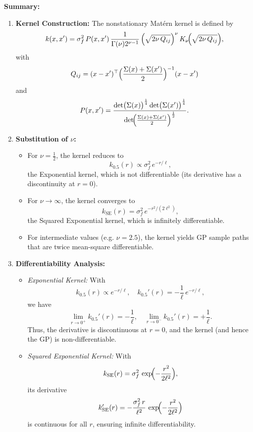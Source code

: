 \documentclass[11pt]{article}
\begin{document}
\textbf{Summary:}
\begin{enumerate}[label=(\arabic*)]
    \item \textbf{Kernel Construction:} The nonstationary Matérn kernel is defined by
    \[
    k(x,x')=\sigma_f^2\, P(x,x')\, \frac{1}{\Gamma(\nu)2^{\nu-1}}
    \left(\sqrt{2\nu\,Q_{ij}}\right)^{\nu}K_{\nu}\!\Bigl({\sqrt{2\nu\,Q_{ij}}}\Bigr),
    \]
    with
    \[
    Q_{ij}=(x-x')^\top\Bigl({\frac{\Sigma(x)+\Sigma(x')}{2}}\Bigr)^{-1}(x-x')
    \]
    and
    \[
    P(x,x')=\frac{\det\bigl(\Sigma(x)\bigr)^{\frac{1}{4}}\det\bigl(\Sigma(x')\bigr)^{\frac{1}{4}}}{\det\!\Bigl({\frac{\Sigma(x)+\Sigma(x')}{2}}\Bigr)^{\frac{1}{2}}}.
    \]
    \item \textbf{Substitution of $\nu$:} 
    \begin{itemize}
        \item For $\nu=\frac{1}{2}$, the kernel reduces to 
        \[
        k_{0.5}(r)\propto\sigma_f^2\,e^{-r/\ell},
        \]
        the Exponential kernel, which is not differentiable (its derivative has a discontinuity at $r=0$).
        \item For $\nu\to\infty$, the kernel converges to 
        \[
        k_{\text{SE}}(r)=\sigma_f^2\,e^{-r^2/(2\ell^2)},
        \]
        the Squared Exponential kernel, which is infinitely differentiable.
        \item For intermediate values (e.g. $\nu=2.5$), the kernel yields GP sample paths that are twice mean-square differentiable.
    \end{itemize}
    \item \textbf{Differentiability Analysis:}
    \begin{itemize}
        \item \emph{Exponential Kernel:} With 
        \[
        k_{0.5}(r)\propto e^{-r/\ell},\quad k_{0.5}'(r)=-\frac{1}{\ell}\,e^{-r/\ell},
        \]
        we have 
        \[
        \lim_{r\to0^+}k_{0.5}'(r)=-\frac{1}{\ell},\quad \lim_{r\to0^-}k_{0.5}'(r)=+\frac{1}{\ell}.
        \]
        Thus, the derivative is discontinuous at $r=0$, and the kernel (and hence the GP) is non-differentiable.
        \item \emph{Squared Exponential Kernel:} With
        \[
        k_{\text{SE}}(r)=\sigma_f^2\,\exp\!\Bigl({-\frac{r^2}{2\ell^2}}\Bigr),
        \]
        its derivative 
        \[
        k_{\text{SE}}'(r)=-\frac{\sigma_f^2\,r}{\ell^2}\,\exp\!\Bigl({-\frac{r^2}{2\ell^2}}\Bigr)
        \]
        is continuous for all $r$, ensuring infinite differentiability.
    \end{itemize}

\end{enumerate}
\end{document}
